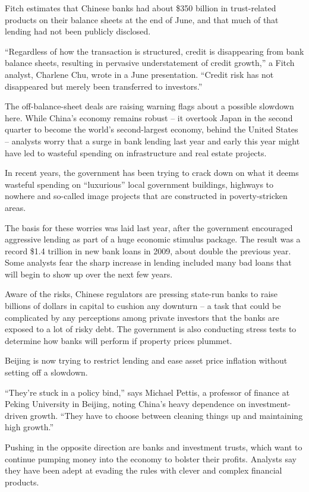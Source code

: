﻿\documentclass[12pt]{article}
\begin{document}
Fitch estimates that Chinese banks had about \$350 billion in trust-related products on their
balance sheets at the end of June, and that much of that lending had not been publicly disclosed.

``Regardless of how the transaction is structured, credit is disappearing from bank balance sheets,
resulting in pervasive understatement of credit growth,'' a Fitch analyst, Charlene Chu, wrote in a
June presentation. ``Credit risk has not disappeared but merely been transferred to investors.''

The off-balance-sheet deals are raising warning flags about a possible slowdown here. While China's
economy remains robust -- it overtook Japan in the second quarter to become the world's
second-largest economy, behind the United States -- analysts worry that a surge in bank lending last
year and early this year might have led to wasteful spending on infrastructure and real estate
projects.

In recent years, the government has been trying to crack down on what it deems wasteful spending on
``luxurious'' local government buildings, highways to nowhere and so-called image projects that are
constructed in poverty-stricken areas.

The basis for these worries was laid last year, after the government encouraged aggressive lending
as part of a huge economic stimulus package. The result was a record \$1.4 trillion in new bank
loans in 2009, about double the previous year. Some analysts fear the sharp increase in lending
included many bad loans that will begin to show up over the next few years.

Aware of the risks, Chinese regulators are pressing state-run banks to raise billions of dollars in
capital to cushion any downturn -- a task that could be complicated by any perceptions among private
investors that the banks are exposed to a lot of risky debt. The government is also conducting
stress tests to determine how banks will perform if property prices plummet.

Beijing is now trying to restrict lending and ease asset price inflation without setting off a
slowdown.

``They're stuck in a policy bind,'' says Michael Pettis, a professor of finance at Peking University
in Beijing, noting China's heavy dependence on investment-driven growth. ``They have to choose
between cleaning things up and maintaining high growth.''

Pushing in the opposite direction are banks and investment trusts, which want to continue pumping
money into the economy to bolster their profits. Analysts say they have been adept at evading the
rules with clever and complex financial products.
\end{document}
